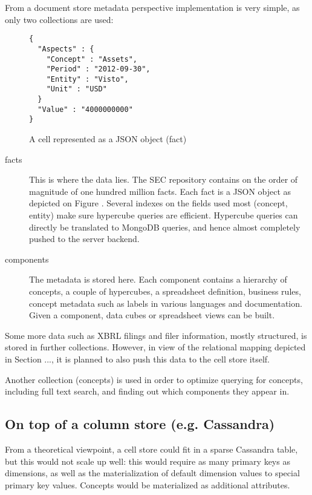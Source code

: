 \documentclass{vldb}
\begin{document}
From a document store metadata perspective implementation is very simple, as only two collections are used:


\begin{figure}
\caption{A cell represented as a JSON object (fact)}
\label{fig-fact}
\begin{lstlisting}
{
  "Aspects" : {
    "Concept" : "Assets",
    "Period" : "2012-09-30",
    "Entity" : "Visto",
    "Unit" : "USD"
  }
  "Value" : "4000000000"
}
\end{lstlisting}
\end{figure}


\begin{description}
\item[facts] This is where the data lies. The SEC repository \cite{SECXBRL.info} contains on the order of magnitude of one hundred million facts. Each fact is a JSON object as depicted on Figure \label{fig-fact}. Several indexes on the fields used most (concept, entity) make sure hypercube queries are efficient. Hypercube queries can directly be translated to MongoDB queries, and hence almost completely pushed to the server backend.
\item[components] The metadata is stored here. Each component contains a hierarchy of concepts, a couple of hypercubes, a spreadsheet definition, business rules, concept metadata such as labels in various languages and documentation. Given a component, data cubes or spreadsheet views can be built.
\end{description}

Some more data such as XBRL filings and filer information, mostly structured, is stored in further collections. However, in view of the relational mapping depicted in Section ..., it is planned to also push this data to the cell store itself.

Another collection (concepts) is used in order to optimize querying for concepts, including full text search, and finding out which components they appear in.

\subsection{On top of a column store (e.g. Cassandra)}

From a theoretical viewpoint, a cell store could fit in a sparse Cassandra table, but this would not scale up well: this would require as many primary keys as dimensions, as well as the materialization of default dimension values to special primary key values. Concepts would be materialized as additional attributes.
\end{document}
